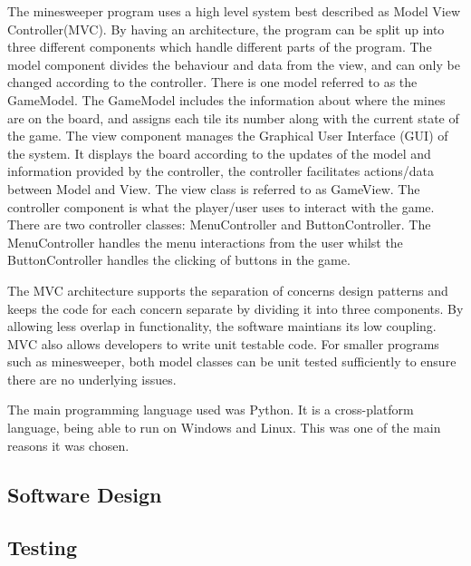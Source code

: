 \documentclass[12pt, a4]{report}
\begin{document}
	\par The minesweeper program uses a high level system best described as Model View Controller(MVC). By having an architecture, the program can be split up into three different components which handle different parts of the program. The model component divides the behaviour and data from the view, and can only be changed according to the controller. There is one model referred to as the GameModel. The GameModel includes the information about where the mines are on the board, and assigns each tile its number along with the current state of the game. The view component manages the Graphical User Interface (GUI) of the system. It displays the board according to the updates of the model and information provided by the controller, the controller facilitates actions/data between Model and View. The view class is referred to as GameView. The controller component is what the player/user uses to interact with the game. There are two controller classes: MenuController and ButtonController. The MenuController handles the menu interactions from the user whilst the ButtonController handles the clicking of buttons in the game.
	\newline
	\par The MVC architecture supports the separation of concerns design patterns and keeps the code for each concern separate by dividing it into three components. By allowing less overlap in functionality, the software maintians its low coupling. MVC also allows developers to write unit testable code. For smaller programs such as minesweeper, both model classes can be unit tested sufficiently to ensure there are no underlying issues. 
	
	\par The main programming language used was Python. It is a cross-platform language, being able to run on Windows and Linux. This was one of the main reasons it was chosen. 

	\pagebreak
	
	\subsection{Software Design}
	\subsubsection{}
	
	
	\pagebreak
	
	
	\subsection{Testing}
	
\end{document}
